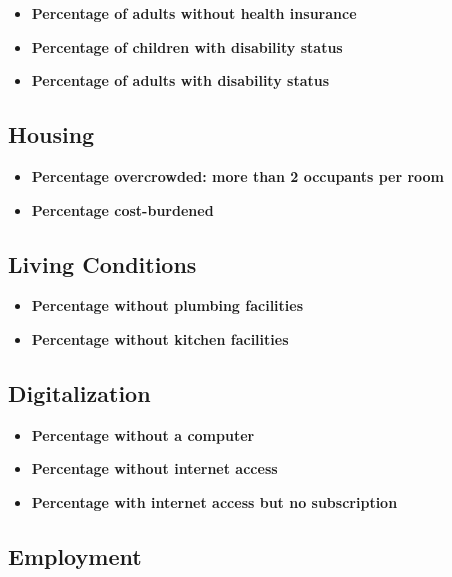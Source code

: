 \documentclass[
  letterpaper,
  DIV=11,
  numbers=noendperiod]{scrreprt}
\providecommand{\tightlist}{%
  \setlength{\itemsep}{0pt}\setlength{\parskip}{0pt}}\usepackage{longtable,booktabs,array}
\begin{document}
\begin{itemize}
\tightlist
\item
  \textbf{Percentage of adults without health insurance}
\item
  \textbf{Percentage of children with disability status}
\item
  \textbf{Percentage of adults with disability status}
\end{itemize}

\subsection{Housing}\label{housing}

\begin{itemize}
\tightlist
\item
  \textbf{Percentage overcrowded: more than 2 occupants per room}
\item
  \textbf{Percentage cost-burdened}
\end{itemize}

\subsection{Living Conditions}\label{living-conditions}

\begin{itemize}
\tightlist
\item
  \textbf{Percentage without plumbing facilities}
\item
  \textbf{Percentage without kitchen facilities}
\end{itemize}

\subsection{Digitalization}\label{digitalization}

\begin{itemize}
\tightlist
\item
  \textbf{Percentage without a computer}
\item
  \textbf{Percentage without internet access}
\item
  \textbf{Percentage with internet access but no subscription}
\end{itemize}

\subsection{Employment}\label{employment}
\end{document}
